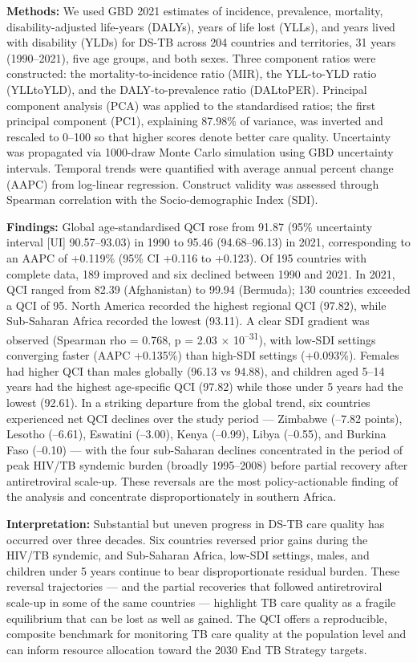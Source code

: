 \documentclass[12pt]{article}
\begin{document}
\textbf{Methods:} We used GBD 2021 estimates of incidence, prevalence, mortality, disability-adjusted life-years (DALYs), years of life lost (YLLs), and years lived with disability (YLDs) for DS-TB across 204 countries and territories, 31 years (1990--2021), five age groups, and both sexes. Three component ratios were constructed: the mortality-to-incidence ratio (MIR), the YLL-to-YLD ratio (YLLtoYLD), and the DALY-to-prevalence ratio (DALtoPER). Principal component analysis (PCA) was applied to the standardised ratios; the first principal component (PC1), explaining 87.98\% of variance, was inverted and rescaled to 0--100 so that higher scores denote better care quality. Uncertainty was propagated via 1000-draw Monte Carlo simulation using GBD uncertainty intervals. Temporal trends were quantified with average annual percent change (AAPC) from log-linear regression. Construct validity was assessed through Spearman correlation with the Socio-demographic Index (SDI).

\textbf{Findings:} Global age-standardised QCI rose from 91.87 (95\% uncertainty interval [UI] 90.57--93.03) in 1990 to 95.46 (94.68--96.13) in 2021, corresponding to an AAPC of +0.119\% (95\% CI +0.116 to +0.123). Of 195 countries with complete data, 189 improved and six declined between 1990 and 2021. In 2021, QCI ranged from 82.39 (Afghanistan) to 99.94 (Bermuda); 130 countries exceeded a QCI of 95. North America recorded the highest regional QCI (97.82), while Sub-Saharan Africa recorded the lowest (93.11). A clear SDI gradient was observed (Spearman rho = 0.768, p = 2.03 $\times$ 10\textsuperscript{--31}), with low-SDI settings converging faster (AAPC +0.135\%) than high-SDI settings (+0.093\%). Females had higher QCI than males globally (96.13 vs 94.88), and children aged 5--14 years had the highest age-specific QCI (97.82) while those under 5 years had the lowest (92.61). In a striking departure from the global trend, six countries experienced net QCI declines over the study period --- Zimbabwe (--7.82 points), Lesotho (--6.61), Eswatini (--3.00), Kenya (--0.99), Libya (--0.55), and Burkina Faso (--0.10) --- with the four sub-Saharan declines concentrated in the period of peak HIV/TB syndemic burden (broadly 1995--2008) before partial recovery after antiretroviral scale-up. These reversals are the most policy-actionable finding of the analysis and concentrate disproportionately in southern Africa.

\textbf{Interpretation:} Substantial but uneven progress in DS-TB care quality has occurred over three decades. Six countries reversed prior gains during the HIV/TB syndemic, and Sub-Saharan Africa, low-SDI settings, males, and children under 5 years continue to bear disproportionate residual burden. These reversal trajectories --- and the partial recoveries that followed antiretroviral scale-up in some of the same countries --- highlight TB care quality as a fragile equilibrium that can be lost as well as gained. The QCI offers a reproducible, composite benchmark for monitoring TB care quality at the population level and can inform resource allocation toward the 2030 End TB Strategy targets.
\end{document}
